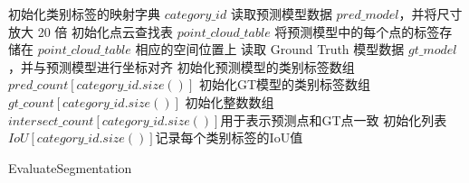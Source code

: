 \begin{algorithm}[htbp]
	\SetAlgoLined
	初始化类别标签的映射字典 $category\_id$\;
	读取预测模型数据 $pred\_model$，并将尺寸放大 20 倍\;
	初始化点云查找表 $point\_cloud\_table$\;
	将预测模型中的每个点的标签存储在 $point\_cloud\_table$ 相应的空间位置上\;
	读取 Ground Truth 模型数据 $gt\_model$，并与预测模型进行坐标对齐\;
	初始化预测模型的类别标签数组 $pred\_count[category\_id.size()]$\;
	初始化GT模型的类别标签数组 $gt\_count[category\_id.size()]$\;
	初始化整数数组 $intersect\_count[category\_id.size()]$用于表示预测点和GT点一致\;
	初始化列表 $IoU[category\_id.size()]$记录每个类别标签的IoU值\;
	\caption{EvaluateSegmentation}
	\label{algo:EvaluateSemanticSegmentation}
\end{algorithm}